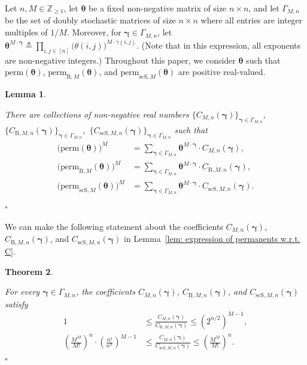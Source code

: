 \documentclass[journal,lettersize,twocolumn]{IEEEtran} %
\newtheorem{theorem}{Theorem}\setcounter{theorem}{0}
\newtheorem{lemma}[theorem]{Lemma}
\newcommand{\elemma}{\hfill$\square$}
\newcommand{\etheorem}{\hfill$\square$}
\newcommand{\vect}[1]{ \bm{#1} }
\newcommand{\vgam}{ \vect{\gamma} }
\newcommand{\sZpp}{\mathbb{Z}_{\geq 1}}
\newcommand{\matr}[1]{ \bm{#1} }
\newcommand{\defeq}{ \triangleq }
\newcommand{\perm}{ \mathrm{perm} }
\newcommand{\permbM}[1]{\perm_{ \mathrm{B}, #1 }}
\newcommand{\permscsM}[1]{ \mathrm{perm}_{\mathrm{scS},#1} }
\newcommand{\CM}[1]{\Cgen{M}{#1}}
\newcommand{\Cgen}[2]{C_{#1,#2}}
\newcommand{\CBM}[1]{\CBgen{M}{#1}}
\newcommand{\CBgen}[2]{C_{\mathrm{B},#1,#2}}
\newcommand{\CscSgen}[2]{C_{\mathrm{scS},#1,#2}}
\newcommand{\mtheta}{\matr{\theta}}
\newcommand{\GamMn}{ \Gamma_{M,n} }
\begin{document}
%

Let $n, M \in \sZpp$, let $\mtheta$ be a fixed non-negative matrix of size
$n \times n$, and let $\GamMn$ be the set of doubly stochastic matrices of
size $n \times n$ where all entries are integer multiples of $1/M$. Moreover,
for $\vgam \in \GamMn$, let
$\mtheta^{ M \cdot \vgam } \defeq \prod_{i,j \in [n]} \bigl( \theta(i,j)
\bigr)^{M \cdot \gamma(i,j)}$. (Note that in this expression, all exponents
are non-negative integers.) Throughout this paper, we consider $ \mtheta $
such that $ \perm(\mtheta) $, $ \permbM{M}(\mtheta) $, and
$ \permscsM{M}(\mtheta) $ are positive real-valued.

%

\begin{lemma}
  \label{lem: expression of permanents w.r.t. C}

  There are collections of non-negative real numbers
  \mbox{$\bigl\{ \CM{n}( \vgam ) \bigr\}_{\vgam \in \GamMn}$,\!
  $\bigl\{ \CBM{n}( \vgam ) \bigr\}_{\vgam \in \GamMn}$,\!
  $\bigl\{ \CscSgen{M}{n}( \vgam ) \bigr\}_{\vgam \in \GamMn}$} such that
  \begin{align}
    \bigl( \perm(\mtheta) \bigr)^{M} 
      &= \sum_{\vgam \in \GamMn} 
           \mtheta^{ M \cdot \vgam }
           \cdot
           \CM{n}( \vgam ), 
             \label{sec:1:eqn:43} \\
    \bigl( \permbM{M}(\mtheta) \bigr)^{M} 
      &= \sum_{\vgam \in \GamMn} 
           \mtheta^{ M \cdot \vgam }
           \cdot
           \CBM{n}( \vgam ),
             \label{sec:1:eqn:190}  \\
    \bigl( \permscsM{M}(\mtheta) \bigr)^{M}
      &= \sum_{\vgam \in \GamMn}
           \mtheta^{ M \cdot \vgam } \cdot \CscSgen{M}{n}( \vgam ).
             \label{sec:1:eqn:168} \\[-0.75cm] \nonumber
  \end{align}
  \elemma
\end{lemma}

%

We can make the following statement about the coefficients $\CM{n}( \vgam )$,
$\CBM{n}( \vgam )$, and $\CscSgen{M}{n}( \vgam )$ in Lemma~\ref{lem:
  expression of permanents w.r.t. C}.

%

\begin{theorem}
  \label{thm: inequalities for the coefficients}

  For every $\vgam \in \GamMn$, the coefficients $\CM{n}( \vgam )$,
  $\CBM{n}( \vgam )$, and $\CscSgen{M}{n}( \vgam )$ satisfy
  \begin{align}
    1 
      &\leq 
         \frac{ \CM{n}(\vgam) }{\CBM{n}(\vgam) }
       \leq
         (2^{n/2})^{M-1},
           \label{sec:1:eqn:58} \\
    \left( \frac{M^{M}}{M!} \right)^{\!\! n}
    \cdot
    \left(
      \frac{ n! }{ n^{n} }
    \right)^{\!\! M-1} 
      &\leq
         \frac{\CM{n}(\vgam)}{\CscSgen{M}{n}(\vgam)} 
       \leq 
         \left( \frac{M^{M}}{M!} \right)^{\!\! n}.
           \label{sec:1:eqn:180}
  \end{align}
  \etheorem
\end{theorem}
\end{document}
